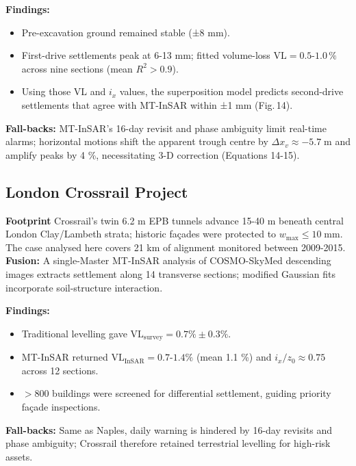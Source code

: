 \documentclass[preprint,11pt,authoryear,3p]{elsarticle}
\begin{document}
\textbf{Findings:}
\begin{itemize}
  \item Pre-excavation ground remained stable (±8 mm).
  \item First-drive settlements peak at 6-13 mm; fitted volume-loss
        $\mathrm{VL}=0.5\text{-}1.0\,\%$ across nine sections
        (mean $R^{2}>0.9$).
  \item Using those VL and $i_x$ values, the superposition model
        predicts second-drive settlements that agree with MT-InSAR within
        ±1 mm (Fig.\,14).
\end{itemize}

\textbf{Fall-backs:} MT-InSAR's 16-day revisit and phase ambiguity limit real-time alarms; horizontal motions shift the apparent trough centre by $\Delta x_v\approx-5.7\;\mathrm{m}$ and amplify peaks by 4 \%, necessitating 3-D correction (Equations 14-15).

\subsection{London Crossrail Project}
\label{subsec:crossrail_case}

\textbf{Footprint} Crossrail's twin 6.2 m EPB tunnels advance 15-40 m beneath central
London Clay/Lambeth strata; historic façades were protected to \(w_{\max}\!\le\!10\;\mathrm{mm}\).  The case analysed here covers 21 km of alignment monitored between 2009-2015. \textbf{Fusion:} A single-Master MT-InSAR analysis of COSMO-SkyMed descending images extracts settlement along 14 transverse sections; modified Gaussian fits incorporate soil-structure interaction.

\textbf{Findings:}
\begin{itemize}
  \item Traditional levelling gave \(\mathrm{VL}_{\text{survey}} = 0.7\%\pm0.3\%\).
  \item MT-InSAR returned \(\mathrm{VL}_{\text{InSAR}} = 0.7\text{-}1.4\%\) (mean 1.1 \%) and \(i_x/z_0\approx0.75\) across 12 sections.
  \item $>$800 buildings were screened for differential settlement, guiding priority façade inspections.
\end{itemize}

\textbf{Fall-backs:} Same as Naples, daily warning is hindered by 16-day revisits and phase ambiguity; Crossrail therefore retained terrestrial levelling for high-risk assets.
\end{document}
